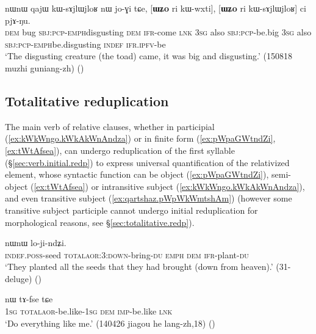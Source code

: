 \begin{exe}
\ex \label{ex:WZo.ri.kWwxti}
\gll nɯnɯ qajɯ kɯ-sɤjlɯ\redp{}jloʁ nɯ jo-ɣi tɕe,  [\textbf{ɯʑo} ri kɯ-wxti], [\textbf{ɯʑo} ri kɯ-sɤjlɯ\redp{}jloʁ] ci pjɤ-ŋu. \\
\textsc{dem} bug \textsc{sbj}:\textsc{pcp}-\textsc{emph}\redp{}disgusting \textsc{dem} \textsc{ifr}-come \textsc{lnk} 
\textsc{3sg} also \textsc{sbj}:\textsc{pcp}-be.big \textsc{3sg} also \textsc{sbj}:\textsc{pcp}-\textsc{emph}\redp{}be.disgusting \textsc{indef} \textsc{ifr}.\textsc{ipfv}-be \\
\glt `The disgusting creature (the toad) came, it was big and disgusting.' (150818 muzhi guniang-zh)
()
\end{exe}
 
\subsection{Totalitative reduplication} \label{sec:totalitative.relatives}
The main verb of relative clauses, whether in participial (\ref{ex:kWkWngo.kWkAkWnAndza}) or in finite form (\ref{ex:pWpaGWtndZi}, \ref{ex:tWtAfsea}), can undergo reduplication of the first syllable (§\ref{sec:verb.initial.redp}) to express universal quantification of the relativized element, whose syntactic function can be object (\ref{ex:pWpaGWtndZi}), semi-object (\ref{ex:tWtAfsea}) or intransitive subject (\ref{ex:kWkWngo.kWkAkWnAndza}), and even transitive subject (\ref{ex:qartshaz.pWpWkWmtshAm}) (however some transitive subject participle cannot undergo initial reduplication for morphological reasons, see §\ref{sec:totalitative.redp}).

\begin{exe}
\ex \label{ex:pWpaGWtndZi}
 nɯnɯ lo-ji-ndʑi. \\
\textsc{indef}.\textsc{poss}-seed \textsc{total}\redp{}\textsc{aor}:3\flobv{}:\textsc{down}-bring-\textsc{du} \textsc{emph} \textsc{dem} \textsc{ifr}-plant-\textsc{du} \\
\glt `They planted all the seeds that they had brought (down from heaven).' (31-deluge)
()
\end{exe}
  

\begin{exe}
\ex \label{ex:tWtAfsea}
 nɯ tɤ-fse tɕe \\
\textsc{1sg} \textsc{total}\redp{}\textsc{aor}-be.like-\textsc{1sg} \textsc{dem} \textsc{imp}-be.like \textsc{lnk} \\
\glt `Do everything like me.' (140426 jiagou he lang-zh,18)
()
\end{exe}

